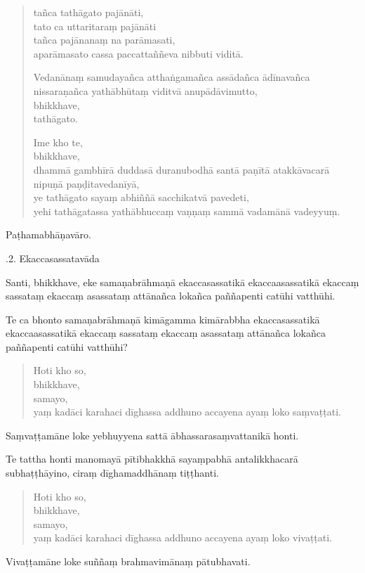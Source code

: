 \documentclass[11pt,twoside,openright]{book}
\begin{document}
\begin{verse}
tañca tathāgato pajānāti,\\
\vin  tato ca uttaritaraṃ pajānāti\\
 tañca pajānanaṃ na parāmasati,\\
\vin  aparāmasato cassa paccattaññeva nibbuti viditā.

Vedanānaṃ samudayañca atthaṅgamañca assādañca ādīnavañca nissaraṇañca yathābhūtaṃ viditvā anupādāvimutto,\\
\vin  bhikkhave,\\
\vin  tathāgato.

Ime kho te,\\
\vin  bhikkhave,\\
\vin  dhammā gambhīrā duddasā duranubodhā santā paṇītā atakkāvacarā nipuṇā paṇḍitavedanīyā,\\
\vin  ye tathāgato sayaṃ abhiññā sacchikatvā pavedeti,\\
\vin  yehi tathāgatassa yathābhuccaṃ vaṇṇaṃ sammā vadamānā vadeyyuṃ.

\end{verse}
\pstart
Paṭhamabhāṇavāro.
\pend

.2. Ekaccasassatavāda
\pend

\pstart
Santi, bhikkhave, eke samaṇabrāhmaṇā ekaccasassatikā ekaccaasassatikā ekaccaṃ sassataṃ ekaccaṃ asassataṃ attānañca lokañca paññapenti catūhi vatthūhi.
\pend

\pstart
Te ca bhonto samaṇabrāhmaṇā kimāgamma kimārabbha ekaccasassatikā ekaccaasassatikā ekaccaṃ sassataṃ ekaccaṃ asassataṃ attānañca lokañca paññapenti catūhi vatthūhi?
\pend

\begin{verse}
Hoti kho so,\\
\vin  bhikkhave,\\
\vin  samayo,\\
\vin  yaṃ kadāci karahaci dīghassa addhuno accayena ayaṃ loko saṃvaṭṭati.

\end{verse}
\pstart
Saṃvaṭṭamāne loke yebhuyyena sattā ābhassarasaṃvattanikā honti.
\pend

\pstart
Te tattha honti manomayā pītibhakkhā sayaṃpabhā antalikkhacarā subhaṭṭhāyino, ciraṃ dīghamaddhānaṃ tiṭṭhanti.
\pend

\begin{verse}
Hoti kho so,\\
\vin  bhikkhave,\\
\vin  samayo,\\
\vin  yaṃ kadāci karahaci dīghassa addhuno accayena ayaṃ loko vivaṭṭati.

\end{verse}
\pstart
Vivaṭṭamāne loke suññaṃ brahmavimānaṃ pātubhavati.
\pend
\end{document}
